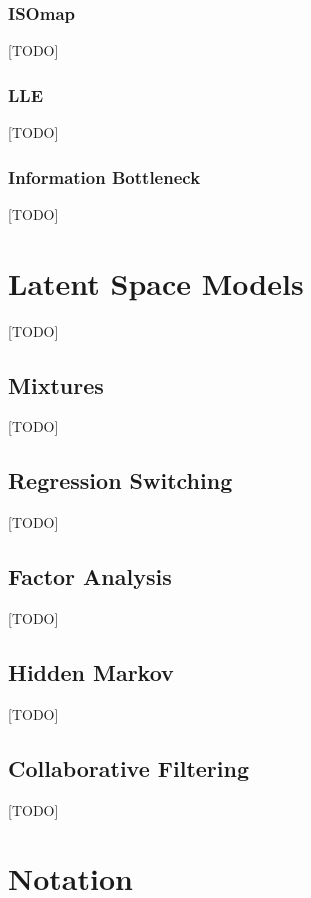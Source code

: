 \subsubsection{ISOmap}
[TODO]


\subsubsection{LLE}
[TODO]


\subsubsection{Information Bottleneck}
[TODO]




\section{Latent Space Models}
\label{sec:latent_space}
[TODO]


\subsection{Mixtures}
[TODO]


\subsection{Regression Switching}
[TODO]



\subsection{Factor Analysis}
[TODO]


\subsection{Hidden Markov}
[TODO]


\subsection{Collaborative Filtering}
[TODO]





\newpage

\appendix



\section{Notation}
\label{sec:notation}


